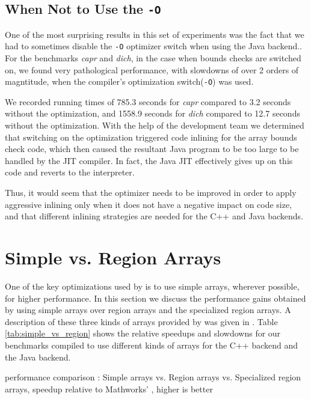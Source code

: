 \subsection{When Not to Use the \xten \texttt{-O}}
\label{sec:BOOM}

One of the most surprising results in this set of experiments was the fact that
we had to sometimes disable the \xten \texttt{-O} optimizer switch when
using the \xten Java backend..
For the benchmarks \emph{capr} and
\emph{dich}, in the case when \xten bounds checks are switched on, we found
very pathological performance, with slowdowns of over 2 orders of magntitude,
when the \xten compiler's optimization switch(\texttt{-O}) was used.

We recorded running times of 785.3 seconds for \emph{capr} compared to 3.2
seconds without the optimization, and 1558.9 seconds for \emph{dich} compared to
12.7 seconds without the optimization.  With the help of the \xten development
team we determined that switching on the optimization triggered code inlining
for the array bounds check code, which then
caused the resultant Java program to be too large to be handled by the JIT
compiler.  In fact, the Java JIT effectively gives up on this code and reverts 
to the interpreter. 

Thus, it would seem that the \xten optimizer needs to be improved in order to
apply aggressive inlining only when it does not have a negative impact on code
size,  and that different inlining strategies are needed for the C++ and Java
backends.

\section{Simple vs. Region Arrays} \label{sec:EvalArrays}

One of the key optimizations used by \mixten is to use simple arrays,
wherever possible, for higher performance.  In this section we discuss the
performance gains obtained by using simple arrays over region arrays and
the specialized region arrays.  A description of these three kinds of arrays
provided by \xten was given in .  Table
\ref{tab:simple_vs_region} shows the relative speedups and slowdowns for our
benchmarks compiled to use different kinds of \xten arrays for the C++ backend
and the Java backend.

\begin{table}[htbp]
\begin{center} 
\scalebox{0.67}{

}
\caption{\mixten performance comparison : Simple
arrays vs. Region arrays vs.  Specialized region arrays, speedup relative to 
Mathworks' \matlab, higher is better} 
\label{tab:simple_vs_region} 
\end{center}
\end{table}


